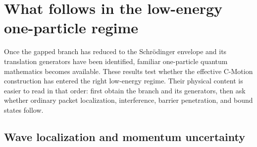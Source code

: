 \documentclass[11pt]{article}
\theoremstyle{definition}
\begin{document}
\section{What follows in the low-energy one-particle regime}
\label{sec:controls}

Once the gapped branch has reduced to the Schrödinger envelope and its translation generators
have been identified, familiar one-particle quantum mathematics becomes available.  These
results test whether the effective C-Motion construction has entered the right low-energy
regime.  Their physical content is easier to read in that order: first obtain the branch and
its generators, then ask whether ordinary packet localization, interference, barrier
penetration, and bound states follow.

\subsection{Wave localization and momentum uncertainty}
\label{sec:uncertainty}
\end{document}
